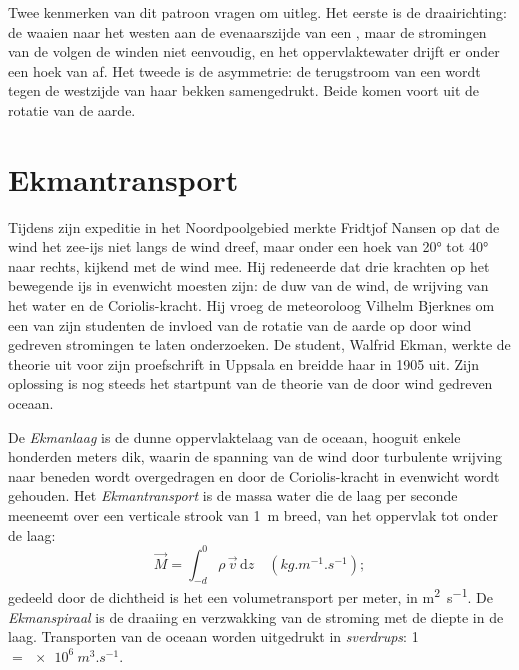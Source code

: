 
Twee kenmerken van dit patroon vragen om uitleg. Het eerste is de draairichting: de  waaien naar het westen aan de evenaarszijde van een , maar de stromingen van de  volgen de winden niet eenvoudig, en het oppervlaktewater drijft er onder een hoek van af. Het tweede is de asymmetrie: de terugstroom van een  wordt tegen de westzijde van haar bekken samengedrukt. Beide komen voort uit de rotatie van de aarde.

\section{Ekmantransport}\label{sec:b1:ocean-circulation:ekman}

\begin{history}
Tijdens zijn expeditie in het Noordpoolgebied merkte Fridtjof Nansen op dat de wind het zee-ijs niet langs de wind dreef, maar onder een hoek van \ang{20} tot \ang{40} naar rechts, kijkend met de wind mee. Hij redeneerde dat drie krachten op het bewegende ijs in evenwicht moesten zijn: de duw van de wind, de wrijving van het water en de Coriolis-kracht. Hij vroeg de meteoroloog Vilhelm Bjerknes om een van zijn studenten de invloed van de rotatie van de aarde op door wind gedreven stromingen te laten onderzoeken. De student, Walfrid Ekman, werkte de theorie uit voor zijn proefschrift in Uppsala en breidde haar in 1905 uit. Zijn oplossing is nog steeds het startpunt van de theorie van de door wind gedreven oceaan.
\end{history}

\begin{definition}\label{def:b1:ocean-circulation:ekman}
De \emph{Ekmanlaag} is de dunne oppervlaktelaag van de oceaan, hooguit enkele honderden meters dik, waarin de spanning van de wind door turbulente wrijving naar beneden wordt overgedragen en door de Coriolis-kracht in evenwicht wordt gehouden. Het \emph{Ekmantransport} is de massa water die de laag per seconde meeneemt over een verticale strook van \qty{1}{m} breed, van het oppervlak tot onder de laag:
\[
  \vec M = \int_{-d}^{0} \rho\,\vec v\,\mathrm dz \quad (\unit{kg.m^{-1}.s^{-1}});
\]
gedeeld door de dichtheid is het een volumetransport per meter, in
\unit{m^2.s^{-1}}. De \emph{Ekmanspiraal} is de draaiing en verzwakking van de stroming met de diepte in de laag. Transporten van de oceaan worden uitgedrukt in \emph{sverdrups}: \qty{1}{\sverdrup} $=
\qty{e6}{m^3.s^{-1}}$.
\end{definition}

